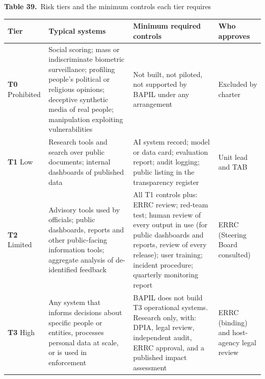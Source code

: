 \documentclass[border=10pt]{standalone}
\begin{document}
\begin{minipage}{17cm}
{\large\bfseries Table 39.}\ {\large Risk tiers and the minimum controls each tier requires}\par\vspace{7pt}
\small
{}
\begin{tabularx}{\linewidth}{@{}>{\hsize=0.667\hsize\raggedright\arraybackslash}X>{\hsize=1.067\hsize\raggedright\arraybackslash}X>{\hsize=1.600\hsize\raggedright\arraybackslash}X>{\hsize=0.667\hsize\raggedright\arraybackslash}X@{}}
\arrayrulecolor{bapilrule}\toprule
\rowcolor{white}\textbf{Tier} & \textbf{Typical systems} & \textbf{Minimum required controls} & \textbf{Who approves} \\
\midrule
\textbf{T0} Prohibited & Social scoring; mass or indiscriminate biometric surveillance; profiling people’s political or religious opinions; deceptive synthetic media of real people; manipulation exploiting vulnerabilities & Not built, not piloted, not supported by BAPIL under any arrangement & Excluded by charter \\
\textbf{T1} Low & Research tools and search over public documents; internal dashboards of published data & AI system record; model or data card; evaluation report; audit logging; public listing in the transparency register & Unit lead and TAB \\
\textbf{T2} Limited & Advisory tools used by officials; public dashboards, reports and other public-facing information tools; aggregate analysis of de-identified feedback & All T1 controls plus: ERRC review; red-team test; human review of every output in use (for public dashboards and reports, review of every release); user training; incident procedure; quarterly monitoring report & ERRC (Steering Board consulted) \\
\textbf{T3} High & Any system that informs decisions about specific people or entities, processes personal data at scale, or is used in enforcement & BAPIL does not build T3 operational systems. Research only, with: DPIA, legal review, independent audit, ERRC approval, and a published impact assessment & ERRC (binding) and host-agency legal review \\
\bottomrule
\end{tabularx}
\par{}
\end{minipage}
\end{document}
